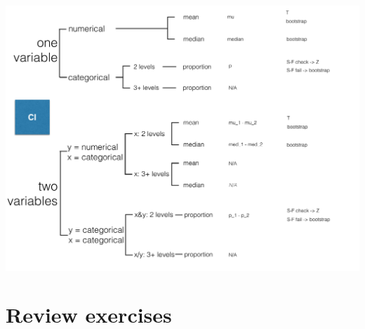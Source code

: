 \documentclass[slidestop,compress,mathserif,12pt,t,professionalfonts,xcolor=table]{beamer}
\begin{document}

\begin{frame}

\begin{center}
\includegraphics[width=\textwidth]{figures/mt2_review_map3}
\end{center}

\end{frame}


\section{Review exercises}

\end{document}

